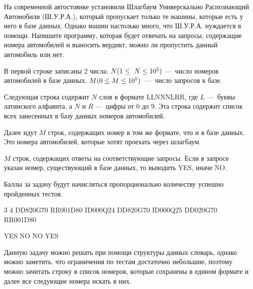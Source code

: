 
На современной автостоянке установили Шлагбаум Универскально Распознающий Автомобили (Ш.У.Р.А.), который пропускает только те машины, которые есть у него в базе данных. Однако машин настолько много, что Ш.У.Р.А. нуждается в помощи. Напишите программу, которая будет отвечать на запросы, содержащие номера автомобилей и выносить вердикт, можно ли пропустить данный автомобиль или нет.


В первой строке записаны 2 числа:
$N\space (1 \leq N \leq 10^5)$ — число номеров автомобилей в базе данных.
$M\space (0 \leq M \leq 10^5)$ — число запросов к базе.

Следующая строка содержит $N$ слов в формате LLNNNLRR, где $L$ — буквы латинского алфавита, а $N$ и $R$ — цифры от $0$ до $9$. Эта строка содержит список всех занесенных в базу данных номеров автомобилей.

Далее идут $M$ строк, содержащих номер в том же формате, что и в базе данных. Это номера автомобилей, которые хотят проехать через шлагбаум.

\outputfmtSection

$M$ строк, содержащих ответы на соответствующие запросы. Если в запросе указан номер, существующий в базе данных, то выводить YES, иначе NO.

\markSection

Баллы за задачу будут начисляться пропорционально количеству успешно пройденных тестов.


\begin{myverbbox}[\small]{\vinput}
    3 4
    DD820G70 RR001D80 ID000Q24
    DD820G70
    ID000Q25
    DD020G70
    RR001D80
\end{myverbbox}
\begin{myverbbox}[\small]{\voutput}
    YES
    NO
    NO
    YES
\end{myverbbox}

\solutionSection

Данную задачу можно решать при помощи структуры данных словарь, однако можно заметить, что ограничения по тестам достаточно небольшие, поэтому можно зачитать строку в список номеров, которые сохранены в едином формате и далее все следующие номера искать в них.

